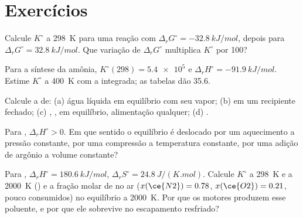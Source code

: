 \section{Exercícios}

\begin{exercise}[$\star$]\label{exo:b2:equilibrium-shifts:1}
Calcule $K^\circ$ a \qty{298}{K} para uma reação com $\Delta_r G^\circ =
\qty{-32.8}{kJ/mol}$, depois para $\Delta_r G^\circ = \qty{+32.8}{kJ/mol}$.
Que variação de $\Delta_r G^\circ$ multiplica $K^\circ$ por 100?
\end{exercise}

\begin{exercise}[$\star$]\label{exo:b2:equilibrium-shifts:2}
Para a síntese da amônia, $K^\circ(298) = \num{5.4e5}$ e $\Delta_r H^\circ =
\qty{-91.9}{kJ/mol}$. Estime $K^\circ$ a \qty{400}{K} com a  integrada; as tabelas dão 35.6.
\end{exercise}

\begin{exercise}[$\star$]\label{exo:b2:equilibrium-shifts:3}
Calcule a  de: (a) água líquida em equilíbrio com seu vapor;
(b)  em um recipiente fechado; (c) ,
,  em equilíbrio, alimentação qualquer; (d) .
\end{exercise}

\begin{exercise}[$\star$]\label{exo:b2:equilibrium-shifts:4}
Para , $\Delta_r H^\circ > 0$. Em que sentido o
equilíbrio é deslocado por um aquecimento a pressão constante, por uma
compressão a temperatura constante, por uma adição de argônio a volume constante?
\end{exercise}

\begin{exercise}[$\star\star$]\label{exo:b2:equilibrium-shifts:5}
Para , $\Delta_r H^\circ = \qty{180.6}{kJ/mol}$,
$\Delta_r S^\circ = \qty{24.8}{J/(K.mol)}$. Calcule $K^\circ$ a \qty{298}{K}
e a \qty{2000}{K} () e a fração molar de
 no ar ($x(\ce{N2}) = 0.78$, $x(\ce{O2}) = 0.21$, pouco consumidos) no
equilíbrio a \qty{2000}{K}. Por que os motores produzem esse poluente, e por que
ele sobrevive no escapamento resfriado?
\end{exercise}

